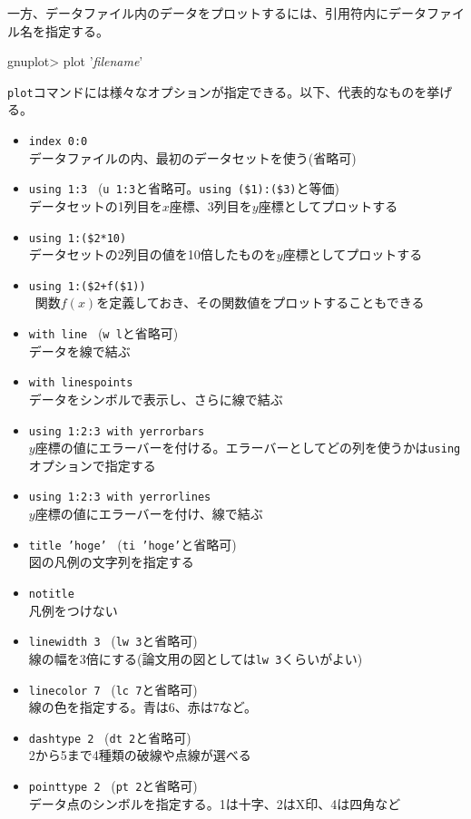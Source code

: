 一方、データファイル内のデータをプロットするには、引用符内にデータファイル名を指定する。
\begin{commandline2}
    gnuplot> plot '\textit{filename}'
\end{commandline2} \noindent
\texttt{plot}コマンドには様々なオプションが指定できる。以下、代表的なものを挙げる。
\begin{itemize}
    \item \texttt{index 0:0} \\
          データファイルの内、最初のデータセットを使う(省略可)
    \item \texttt{using 1:3} \ (\texttt{u 1:3}と省略可。\texttt{using (\$1):(\$3)}と等価) \\
          データセットの1列目を\(x\)座標、3列目を\(y\)座標としてプロットする
    \item \texttt{using 1:(\$2*10)} \\
          データセットの2列目の値を10倍したものを\(y\)座標としてプロットする
    \item \texttt{using 1:(\$2+f(\$1))} \\\
          関数\(f(x)\)を定義しておき、その関数値をプロットすることもできる
    \item \texttt{with line} \ (\texttt{w l}と省略可) \\
          データを線で結ぶ
    \item \texttt{with linespoints} \\
          データをシンボルで表示し、さらに線で結ぶ
    \item \texttt{using 1:2:3 with yerrorbars} \\
          \(y\)座標の値にエラーバーを付ける。エラーバーとしてどの列を使うかは\texttt{using}オプションで指定する
    \item \texttt{using 1:2:3 with yerrorlines} \\
          \(y\)座標の値にエラーバーを付け、線で結ぶ
    \item \texttt{title 'hoge'} \ (\texttt{ti 'hoge'}と省略可) \\
          図の凡例の文字列を指定する
    \item \texttt{notitle} \\
          凡例をつけない
    \item \texttt{linewidth 3} \ (\texttt{lw 3}と省略可) \\
          線の幅を3倍にする(論文用の図としては\texttt{lw 3}くらいがよい)
    \item \texttt{linecolor 7} \ (\texttt{lc 7}と省略可) \\
          線の色を指定する。青は6、赤は7など。
    \item \texttt{dashtype 2} \ (\texttt{dt 2}と省略可) \\
          2から5まで4種類の破線や点線が選べる
    \item \texttt{pointtype 2} \ (\texttt{pt 2}と省略可) \\
          データ点のシンボルを指定する。1は十字、2はX印、4は四角など
\end{itemize}
